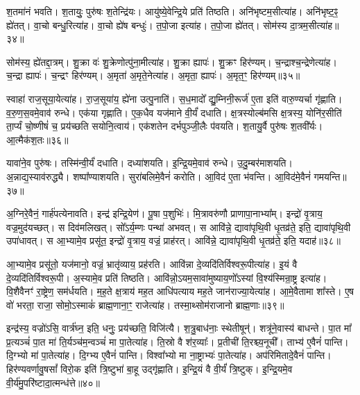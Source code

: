 श॒तमा॑नं भवति।
श॒तायुः॒ पुरु॑षः श॒तेन्द्रि॑यः।
आयु॑ष्ये॒वेन्द्रि॒ये प्रति॑ तिष्ठति।
अनि॑भृष्टम॒सीत्या॑ह।
अनि॑भृष्ट॒ꣴ॒ ह्ये॑तत्।
वा॒चो बन्धु॒रित्या॑ह।
वा॒चो ह्ये॑ष बन्धुः॑।
त॒पो॒जा इत्या॑ह।
त॒पो॒जा ह्ये॑तत्।
सोम॑स्य दा॒त्रम॒सीत्या॑ह॥३४॥\ip

सोम॑स्य॒ ह्ये॑तद्दा॒त्रम्।
शु॒क्रा वः॑ शु॒क्रेणोत्पु॑ना॒मीत्या॑ह।
शु॒क्रा ह्यापः॑।
शु॒क्रꣳ हिर॑ण्यम्।
च॒न्द्राश्च॒न्द्रेणेत्या॑ह।
च॒न्द्रा ह्यापः॑।
च॒न्द्रꣳ हिर॑ण्यम्।
अ॒मृता॑ अ॒मृते॒नेत्या॑ह।
अ॒मृता॒ ह्यापः॑।
अ॒मृत॒ꣳ॒ हिर॑ण्यम्॥३५॥\ip

स्वाहा॑ राज॒सूया॒येत्या॑ह।
रा॒ज॒सूया॑य॒ ह्ये॑ना उत्पु॒नाति॑।
स॒ध॒मादो᳚ द्यु॒म्निनी॒रूर्ज॑ ए॒ता इति॑ वारु॒ण्यर्चा गृ॑ह्णाति।
व॒रु॒ण॒स॒वमे॒वाव॑ रुन्धे।
एक॑या गृह्णाति।
ए॒क॒धैव यज॑माने वी॒र्यं॑ दधाति।
क्ष॒त्रस्योल्ब॑मसि क्ष॒त्रस्य॒ योनि॑र॒सीति॑ ता॒र्प्यं चो॒ष्णीषं॑ च॒ प्रय॑च्छति सयोनि॒त्वाय॑।
एक॑शतेन दर्भपुञ्जी॒लैः प॑वयति।
श॒तायु॒र्वै पुरु॑षः श॒तवी᳚र्यः।
आ॒त्मैक॑श॒तः॥३६॥\ip

यावा॑ने॒व पुरु॑षः।
तस्मि॑न्वी॒र्यं॑ दधाति।
दध्या॑शयति।
इ॒न्द्रि॒यमे॒वाव॑ रुन्धे।
उ॒दु॒म्बर॑माशयति।
अ॒न्नाद्य॒स्या\-व॑\-रुद्ध्यै।
शष्पा᳚ण्याशयति।
सुरा॑बलिमे॒वैनं॑ करोति।
आ॒विद॑ ए॒ता भ॑वन्ति।
आ॒विद॑मे॒वैनं॑ गमयन्ति॥३७॥\ip

अ॒ग्निरे॒वैनं॒ गार्\mbox{}ह॑पत्येनावति।
इन्द्र॑ इन्द्रि॒येण॑।
पू॒षा प॒शुभिः॑।
मि॒त्रावरु॑णौ प्राणापा॒नाभ्या᳚म्।
इन्द्रो॑ वृ॒त्राय॒ वज्र॒मुद॑यच्छत्।
स दिव॑मलिखत्।
सो᳚ऽर्य॒म्णः पन्था॑ अभवत्।
स आवि॑न्ने॒ द्यावा॑पृथि॒वी धृ॒तव्र॑ते॒ इति॒ द्यावा॑पृथि॒वी उपा॑धावत्।
स आ॒भ्यामे॒व प्रसू॑त॒ इन्द्रो॑ वृ॒त्राय॒ वज्रं॒ प्राह॑रत्।
आवि॑न्ने॒ द्यावा॑पृथि॒वी धृ॒तव्र॑ते॒ इति॒ यदाह॑॥३८॥\ip

आ॒भ्यामे॒व प्रसू॑तो॒ यज॑मानो॒ वज्रं॒ भ्रातृ॑व्याय॒ प्रह॑रति।
आवि॑न्ना दे॒व्यदि॑तिर्विश्वरू॒पीत्या॑ह।
इ॒यं वै दे॒व्यदि॑तिर्विश्व\-रू॒पी।
अ॒स्यामे॒व प्रति॑ तिष्ठति।
आवि॑न्नो॒\-ऽयम॒सावा॑मुष्या\-य॒णो᳚\-ऽस्यां वि॒श्य॑स्मिन्रा॒ष्ट्र इत्या॑ह।
वि॒शैवैनꣳ॑ रा॒ष्ट्रेण॒ सम॑र्धयति।
म॒ह॒ते क्ष॒त्राय॑ मह॒त आधि॑पत्याय मह॒ते जान॑राज्या॒येत्या॑ह।
आ॒\-मे॒वैतामा शा᳚स्ते।
ए॒ष वो॑ भरता॒ राजा॒ सोमो॒\-ऽस्माकं॑ ब्राह्म॒णाना॒ꣳ॒ राजेत्या॑ह।
तस्मा॒थ्सोम॑राजानो ब्राह्म॒णाः॥३९॥\ip

इन्द्र॑स्य॒ वज्रो॑ऽसि॒ वार्त्र॑घ्न॒ इति॒ धनुः॒ प्रय॑च्छति॒ विजि॑त्यै।
श॒त्रु॒बाध॑नाः॒ स्थेतीषून्॑।
शत्रू॑ने॒वास्य॑ बाधन्ते।
पा॒त मा᳚ प्र॒त्यञ्चं॑ पा॒त मा॑ ति॒र्यञ्च॑म॒न्वञ्चं॑ मा पा॒तेत्या॑ह।
ति॒स्रो वै श॑र॒व्याः᳚।
प्र॒तीची॑ ति॒रश्च्य॒नूची᳚।
ताभ्य॑ ए॒वैनं॑ पान्ति।
दि॒ग्भ्यो मा॑ पा॒तेत्या॑ह।
दि॒ग्भ्य ए॒वैनं॑ पान्ति।
विश्वा᳚भ्यो मा ना॒ष्ट्राभ्यः॑ पा॒तेत्या॑ह।
अप॑रिमितादे॒वैनं॑ पान्ति।
हिर॑ण्यवर्णावु॒षसां᳚ विरो॒क इति॑ त्रि॒ष्टुभा॑ बा॒हू उद्गृ॑ह्णाति।
इ॒न्द्रि॒यं वै वी॒र्यं॑ त्रि॒ष्टुक्।
इ॒न्द्रि॒यमे॒व वी॒र्य॑मु॒परि॑ष्टादा॒त्मन्ध॑त्ते॥४०॥\ip\anuvakamend[व्यावृ॑त्त्यै दा॒त्रम॒सीत्या॑हा॒मृत॒ꣳ॒ हिर॑ण्यमेकश॒तो ग॑मय॒न्त्याह॑ ब्राह्म॒णा ना॒ष्ट्राभ्यः॑ पा॒तेत्या॑ह च॒त्वारि॑ च]

